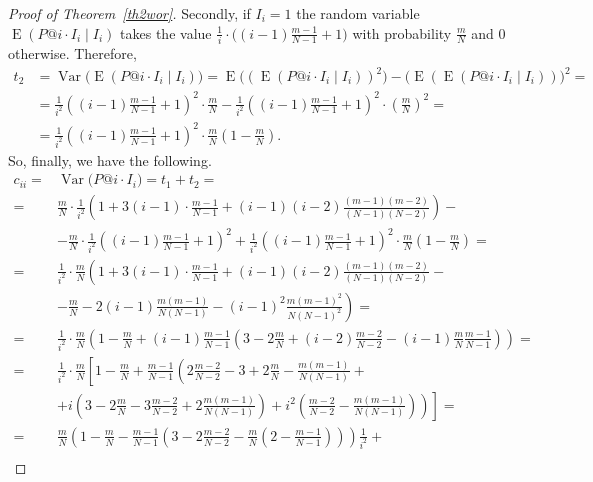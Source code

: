 \documentclass{tpms-l}
\theoremstyle{definition}
\theoremstyle{remark}
\numberwithin{equation}{section}
\begin{document}
\begin{proof}[Proof of Theorem~\ref {th2wor}]
Secondly, if $I_i=1$ the random variable $\operatorname{E}(P@i\cdot I_i \mid I_i)$ takes the value $\frac{1}{i}\cdot \big((i-1)\frac{m-1}{N-1}+1\big)$ with probability $\frac{m}{N}$ and $0$ otherwise. Therefore, 
\begin{equation*}
\begin{split} t_2&=\operatorname{Var}\big(\operatorname{E}(P@i\cdot I_i \mid I_i)\big)=\operatorname{E}\big((\operatorname{E}(P@i\cdot I_i \mid I_i))^2\big)-\big(\operatorname{E}(\operatorname{E}(P@i\cdot I_i \mid I_i))\big)^2=\\
&=\frac{1}{i^2}\left((i-1)\frac{m-1}{N-1}+1\right)^2\cdot \frac{m}{N}-\frac{1}{i^2}\left((i-1)\frac{m-1}{N-1}+1\right)^2\cdot \left(\frac{m}{N}\right)^2=\\
&=\frac{1}{i^2}\left((i-1)\frac{m-1}{N-1}+1\right)^2\cdot \frac{m}{N}\left(1-\frac{m}{N}\right).
\end{split}
\end{equation*}
So, finally, we have the following.
\begin{equation*}
\begin{split}
c_{ii}=&\operatorname{Var}\big(P@i\cdot I_i\big)=t_1+t_2=\\
= &\frac{m}{N} \cdot \frac{1}{i^2} \left(1+3(i-1)\cdot \frac{m-1}{N-1}+
(i-1)(i-2)\frac{(m-1)(m-2)}{(N-1)(N-2)}\right)-\\
&-\frac{m}{N} \cdot \frac{1}{i^2} \left((i-1)\frac{m-1}{N-1}+1\right)^2 +
\frac{1}{i^2}\left((i-1)\frac{m-1}{N-1}+1\right)^2\cdot \frac{m}{N}\left(1-\frac{m}{N}\right)=
\\
= &\frac{1}{i^2}\cdot \frac{m}{N} \left(1+3(i-1)\cdot \frac{m-1}{N-1}+
(i-1)(i-2)\frac{(m-1)(m-2)}{(N-1)(N-2)}-\right.\\
& -\left.\frac{m}{N}-2(i-1)\frac{m(m-1)}{N(N-1)} - 
 (i-1)^2\frac{m(m-1)^2}{N(N-1)^2} \right)=\\
= &\frac{1}{i^2}\cdot \frac{m}{N} \left(1- \frac{m}{N}+(i-1)\frac{m-1}{N-1}\left(3-2\frac{m}{N}+(i-2)\frac{m-2}{N-2}-(i-1)\frac{m}{N} \frac{m-1}{N-1}\right) \right)=\\
=& \frac{1}{i^2} \cdot \frac{m}{N} \left[1- \frac{m}{N}+\frac{m-1}{N-1} \left(2\frac{m-2}{N-2}-3+2\frac{m}{N}-\frac{m(m-1)}{N(N-1)}+ \right. \right.\\
&\left. \left. + i\left(3-2\frac{m}{N}-3\frac{m-2}{N-2}+2\frac{m(m-1)}{N(N-1)}\right) + i^2\left(\frac{m-2}{N-2}-\frac{m(m-1)}{N(N-1)}\right) \right) \right]=\\
= & \frac{m}{N} \left(1- \frac{m}{N}-\frac{m-1}{N-1} \left(3-2\frac{m-2}{N-2}-\frac{m}{N}\left(2-\frac{m-1}{N-1}\right)\right)\right)\frac{1}{i^2}+\\

\end{split}
\end{equation*}
\end{proof}
\end{document}
